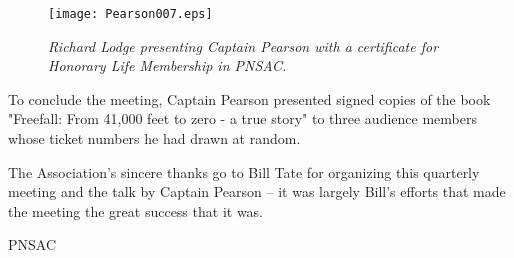 \begin{figure}[htbp]
   \vspace{2em}
   \centering
   \texttt{[image: Pearson007.eps]}
   \caption*{\small \em Richard Lodge presenting Captain Pearson with a
     certificate for Honorary Life Membership in PNSAC.}
   \label{fig:engine3propcowl}
\end{figure}

To conclude the meeting, Captain Pearson presented signed copies of
the book "Freefall: From 41,000 feet to zero - a true story" to three
audience members whose ticket numbers he had drawn at random.

The Association's sincere thanks go to Bill Tate for organizing this
quarterly meeting and the talk by Captain Pearson -- it was largely
Bill's efforts that made the meeting the great success that it was.


\begin{footnotesize}
    \raggedleft PNSAC\\
\end{footnotesize}

